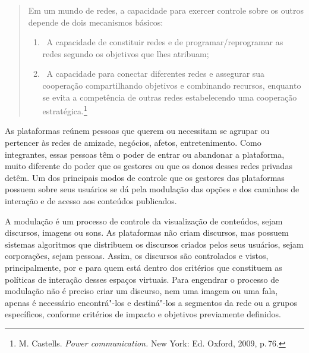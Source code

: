 

\begin{quote}
Em um mundo de redes, a capacidade para exercer controle sobre os outros
depende de dois mecanismos básicos:
\begin{enumerate}
\item\, A capacidade de constituir redes
e de programar/reprogramar as redes segundo os objetivos que lhes
atribuam;
\item\, A capacidade para conectar diferentes redes e assegurar
sua cooperação compartilhando objetivos e combinando recursos, enquanto
se evita a competência de outras redes estabelecendo uma cooperação
estratégica.\footnote{M. Castells. \textit{Power communication.} New York: Ed. Oxford,
2009, p.\,76.}
\end{enumerate}
\end{quote}

As plataformas reúnem pessoas que querem ou necessitam se agrupar ou
pertencer às redes de amizade, negócios, afetos, entretenimento. Como
integrantes, essas pessoas têm o poder de entrar ou abandonar a
plataforma, muito diferente do poder que os gestores ou que os donos
desses redes privadas detêm. Um dos principais modos de controle que os
gestores das plataformas possuem sobre seus usuários se dá pela
modulação das opções e dos caminhos de interação e de acesso aos
conteúdos publicados.

A modulação é um processo de controle da visualização de conteúdos,
sejam discursos, imagens ou sons. As plataformas não criam discursos,
mas possuem sistemas algoritmos que distribuem os discursos criados
pelos seus usuários, sejam corporações, sejam pessoas. Assim, os
discursos são controlados e vistos, principalmente, por e para quem está
dentro dos critérios que constituem as políticas de interação desses
espaços virtuais. Para engendrar o processo de modulação não é preciso
criar um discurso, nem uma imagem ou uma fala, apenas é necessário
encontrá"-los e destiná"-los a segmentos da rede ou a grupos específicos,
conforme critérios de impacto e objetivos previamente definidos.

